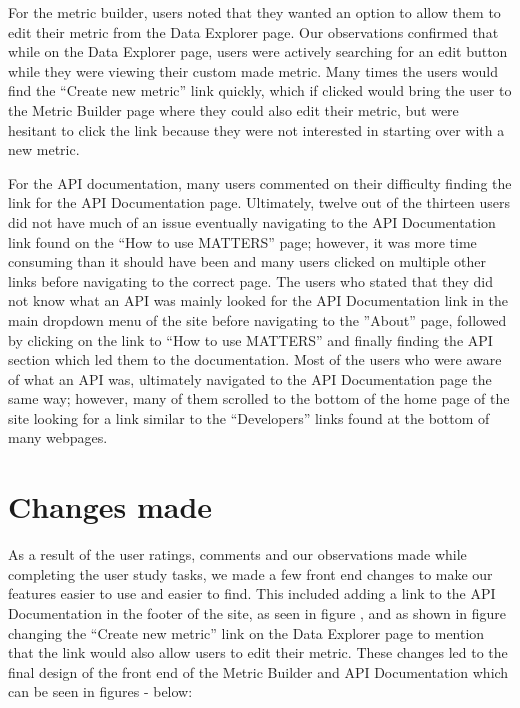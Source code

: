 	For the metric builder, users noted that they wanted an option to allow them to edit their metric from the Data Explorer page. Our observations confirmed that while on the Data Explorer page, users were actively searching for an edit button while they were viewing their custom made metric. Many times the users would find the “Create new metric” link quickly, which if clicked would bring the user to the Metric Builder page where they could also edit their metric, but were hesitant to click the link because they were not interested in starting over with a new metric.
	
	For the API documentation, many users commented on their difficulty finding the link for the API Documentation page. Ultimately, twelve out of the thirteen users did not have much of an issue eventually navigating to the API Documentation link found on the “How to use MATTERS” page; however, it was more time consuming than it should have been and many users clicked on multiple other links before navigating to the correct page. The users who stated that they did not know what an API was mainly looked for the API Documentation link in the main dropdown menu of the site before navigating to the ”About” page, followed by clicking on the link to “How to use MATTERS” and finally finding the API section which led them to the documentation. Most of the users who were aware of what an API was, ultimately navigated to the API Documentation page the same way; however, many of them scrolled to the bottom of the home page of the site looking for a link similar to the “Developers” links found at the bottom of many webpages.
	
\section{Changes made}

	As a result of the user ratings, comments and our observations made while completing the user study tasks, we made a few front end changes to make our features easier to use and easier to find. This included adding a link to the API Documentation in the footer of the site, as seen in figure , and as shown in figure  changing the “Create new metric” link on the Data Explorer page to mention that the link would also allow users to edit their metric. These changes led to the final design of the front end of the Metric Builder and API Documentation which can be seen in figures  -  below:
